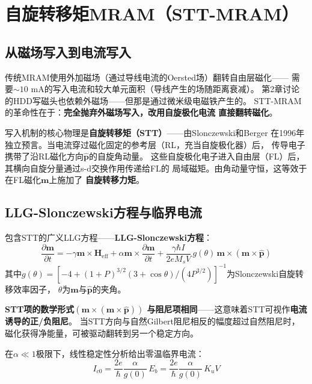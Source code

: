 \documentclass[11pt,a4paper,openany]{book}
\theoremstyle{definition}
\theoremstyle{plain}
\theoremstyle{remark}
\begin{document}
\section{自旋转移矩MRAM（STT-MRAM）}

\subsection{从磁场写入到电流写入}

传统MRAM使用外加磁场（通过导线电流的Oersted场）翻转自由层磁化——
需要$\sim 10$ mA的写入电流和较大单元面积（导线产生的场随距离衰减）。
第2章讨论的HDD写磁头也依赖外磁场——但那是通过微米级电磁铁产生的。
STT-MRAM的革命性在于：\textbf{完全抛弃外磁场写入，改用自旋极化电流
直接翻转磁化}。

写入机制的核心物理是\textbf{自旋转移矩（STT）}——由Slonczewski和Berger
在1996年独立预言。当电流穿过磁化固定的参考层（RL，充当自旋极化器）后，
传导电子携带了沿RL磁化方向$\hat{\mathbf{p}}$的自旋角动量。
这些自旋极化电子进入自由层（FL）后，其横向自旋分量通过s-d交换作用传递给FL的
局域磁矩。由角动量守恒，这等效于在FL磁化$\mathbf{m}$上施加了
\textbf{自旋转移力矩}。

\subsection{LLG-Slonczewski方程与临界电流}

包含STT的广义LLG方程——\textbf{LLG-Slonczewski方程}：
\begin{equation}\label{eq:llg-stt}
  \boxed{
  \frac{\partial\mathbf{m}}{\partial t}
  = -\gamma\mathbf{m}\times\mathbf{H}_{\text{eff}}
  + \alpha\mathbf{m}\times\frac{\partial\mathbf{m}}{\partial t}
  + \frac{\gamma\hbar I}{2e M_s V}\,g(\theta)\,
    \mathbf{m}\times(\mathbf{m}\times\hat{\mathbf{p}})
  }
\end{equation}
其中$g(\theta) = [-4 + (1+P)^{3/2}(3+\cos\theta)/(4P^{3/2})]^{-1}$为Slonczewski自旋转移效率因子，
$\theta$为$\mathbf{m}$与$\hat{\mathbf{p}}$的夹角。

\textbf{STT项的数学形式$(\mathbf{m}\times(\mathbf{m}\times\hat{\mathbf{p}}))$
与阻尼项相同}——这意味着STT可视作\textbf{电流诱导的正/负阻尼}。
当STT方向与自然Gilbert阻尼相反的幅度超过自然阻尼时，
磁化获得净能量，可被驱动翻转到另一个稳定方向。

在$\alpha \ll 1$极限下，线性稳定性分析给出零温临界电流：
\begin{equation}\label{eq:Ic0}
  \boxed{ I_{c0} = \frac{2e}{\hbar}\frac{\alpha}{g(0)}\,E_b
  = \frac{2e}{\hbar}\frac{\alpha}{g(0)}\,K_u V }
\end{equation}
\end{document}
